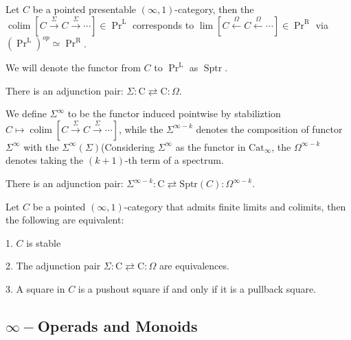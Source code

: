 \begin{proposition}\label{duality}
  Let $C$ be a pointed presentable $(\infty,1)$-category, then the $\operatorname{colim}[C \xrightarrow{\Sigma} C \xrightarrow{\Sigma} \cdots] \in \operatorname{Pr}^{\mathrm{L}}$ corresponds to $\operatorname{lim}[C \xleftarrow{\Omega} C \xleftarrow{\Omega} \cdots] \in \operatorname{Pr}^{\mathrm{R}}$ via $(\operatorname{Pr}^{\mathrm{L}})^{op}\simeq\operatorname{Pr}^{\mathrm{R}}$.

  We will denote the functor from $C$ to $\operatorname{Pr}^{\mathrm{L}}$ as $\operatorname{Sptr}$.
\end{proposition}

\begin{proposition}
    There is an adjunction pair:  $\Sigma: \mathrm{C} \rightleftarrows \mathrm{C}: \Omega$.
\end{proposition}

\begin{definition}
    We define $\Sigma^{\infty}$ to be the functor induced pointwise by stabiliztion $C\mapsto\operatorname{colim}[C \xrightarrow{\Sigma} C \xrightarrow{\Sigma} \cdots] $, while the $\Sigma^{\infty-k}$ denotes the composition of functor $\Sigma^\infty$ with the $\Sigma^{\infty}(\Sigma)$(Considering $\Sigma^\infty$ as the functor in $\text{Cat}_\infty$, the $\Omega^{\infty-k}$ denotes taking the $(k+1)$-th term of a spectrum.
\end{definition}


\begin{proposition}
    There is an adjunction pair:  $\Sigma^{\infty-k}: \mathrm{C} \rightleftarrows \text{Sptr}({C}): \Omega^{\infty-k}$.
\end{proposition}

\begin{proposition}
    Let $C$ be a pointed $(\infty,1)$-category that admits finite limits and colimits, then the following are equivalent:

    1. $C$ is stable
    
    2. The adjunction pair $\Sigma: \mathrm{C} \rightleftarrows \mathrm{C}: \Omega$ are equivalences.
    
    3. A square in $C$ is a pushout square if and only if it is a pullback square.
\end{proposition}

\subsection{$\infty-$Operads and Monoids}\label{monoidal}

